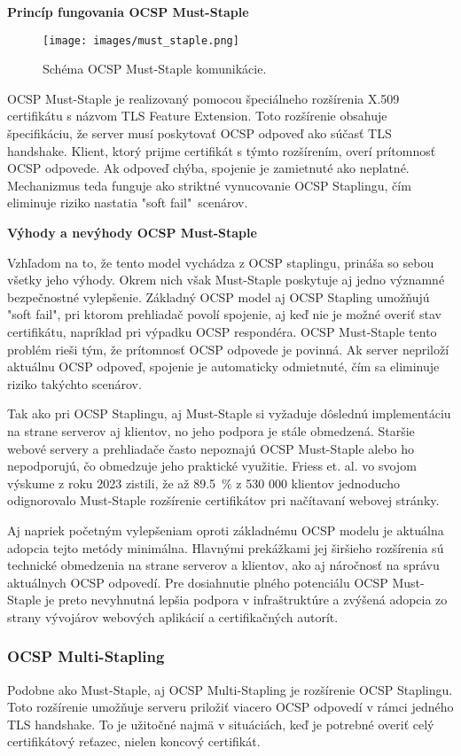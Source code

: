 \documentclass[12pt, twoside]{book}
\newcommand{\subsubsubsection}[1]{%
  \vspace{0.2em}  
  \textbf{#1} \\[0.2em]
  \hspace*{\parindent}
}
\begin{document}
\subsubsubsection{Princíp fungovania OCSP Must-Staple}
\begin{figure}[H]
\centering
\texttt{[image: images/must\_staple.png]}
\caption{Schéma OCSP Must-Staple komunikácie.}
\end{figure}

OCSP Must-Staple je realizovaný pomocou špeciálneho rozšírenia X.509 certifikátu s názvom TLS Feature Extension. Toto rozšírenie obsahuje špecifikáciu, že server musí poskytovať OCSP odpoveď ako súčasť TLS handshake. Klient, ktorý prijme certifikát s týmto rozšírením, overí prítomnosť OCSP odpovede. Ak odpoveď chýba, spojenie je zamietnuté ako neplatné. Mechanizmus teda funguje ako striktné vynucovanie OCSP Staplingu, čím eliminuje riziko nastatia "soft fail"\ scenárov.

\subsubsubsection{Výhody a nevýhody OCSP Must-Staple}
Vzhľadom na to, že tento model vychádza z OCSP staplingu, prináša so sebou všetky jeho výhody. Okrem nich však Must-Staple poskytuje aj jedno významné bezpečnostné vylepšenie. Základný OCSP model aj OCSP Stapling umožňujú "soft fail", pri ktorom prehliadač povolí spojenie, aj keď nie je možné overiť stav certifikátu, napríklad pri výpadku OCSP respondéra. OCSP Must-Staple tento problém rieši tým, že prítomnosť OCSP odpovede je povinná. Ak server nepriloží aktuálnu OCSP odpoveď, spojenie je automaticky odmietnuté, čím sa eliminuje riziko takýchto scenárov.

Tak ako pri OCSP Staplingu, aj Must-Staple si vyžaduje dôslednú implementáciu na strane serverov aj klientov, no jeho podpora je stále obmedzená. Staršie webové servery a prehliadače často nepoznajú OCSP Must-Staple alebo ho nepodporujú, čo obmedzuje jeho praktické využitie. Friess et. al. vo svojom výskume z roku 2023 zistili, že až 89.5~\% z 530 000 klientov jednoducho odignorovalo Must-Staple rozšírenie certifikátov pri načítavaní webovej stránky.\cite{security_pki}

Aj napriek početným vylepšeniam oproti základnému OCSP modelu je aktuálna adopcia tejto metódy minimálna. Hlavnými prekážkami jej širšieho rozšírenia sú technické obmedzenia na strane serverov a klientov, ako aj náročnosť na správu aktuálnych OCSP odpovedí. Pre dosiahnutie plného potenciálu OCSP Must-Staple je preto nevyhnutná lepšia podpora v infraštruktúre a zvýšená adopcia zo strany vývojárov webových aplikácií a certifikačných autorít.


\subsubsection{OCSP Multi-Stapling}
Podobne ako Must-Staple, aj OCSP Multi-Stapling je rozšírenie OCSP Staplingu. Toto rozšírenie umožňuje serveru priložiť viacero OCSP odpovedí v rámci jedného TLS handshake. To je užitočné najmä v situáciách, keď je potrebné overiť celý certifikátový reťazec, nielen koncový certifikát.
\end{document}
